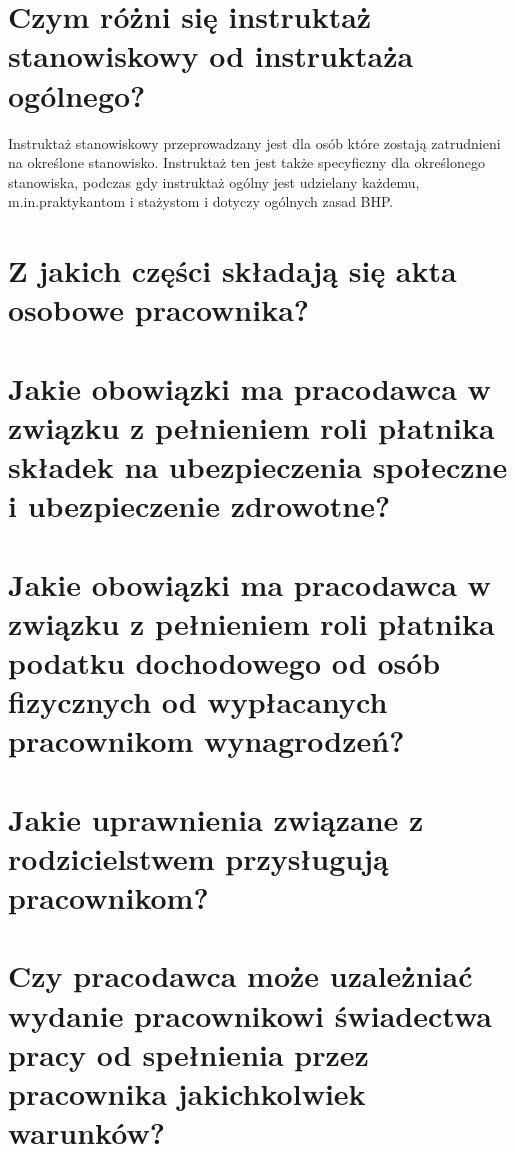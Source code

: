 \documentclass{article}
\begin{document}
\section{Czym różni się instruktaż stanowiskowy od instruktaża ogólnego?}

Instruktaż stanowiskowy przeprowadzany jest dla osób które zostają zatrudnieni na określone stanowisko. Instruktaż ten jest także specyficzny dla określonego stanowiska, podczas gdy instruktaż ogólny jest udzielany każdemu, m.in.\@ praktykantom i stażystom i dotyczy ogólnych zasad BHP.\@

\section{Z jakich części składają się akta osobowe pracownika?}
\section{Jakie obowiązki ma pracodawca w związku z pełnieniem roli płatnika składek na ubezpieczenia społeczne i ubezpieczenie zdrowotne?}
\section{Jakie obowiązki ma pracodawca w związku z pełnieniem roli płatnika podatku dochodowego od osób fizycznych od wypłacanych pracownikom wynagrodzeń?}
\section{Jakie uprawnienia związane z rodzicielstwem przysługują pracownikom?}
\section{Czy pracodawca może uzależniać wydanie pracownikowi świadectwa pracy od spełnienia przez pracownika jakichkolwiek warunków?}
\end{document}
